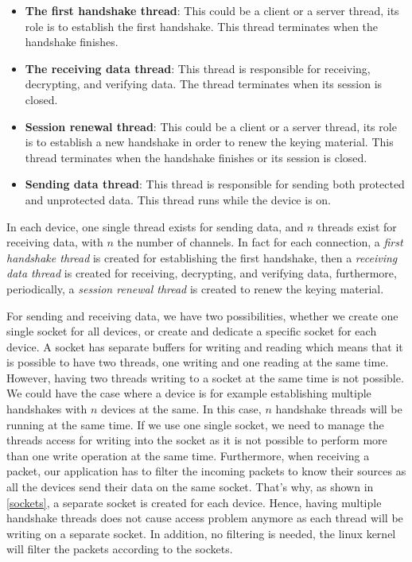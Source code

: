\renewcommand{\labelitemi}{$\bullet$}
\begin{itemize}
\item \textbf{The first handshake thread}: This could be a client or a server thread, its role is to establish
the first handshake. This thread terminates when the handshake finishes.

\item \textbf{The receiving data thread}: This thread is responsible for receiving, decrypting, and verifying
data. The thread terminates when its session is closed.

\item \textbf{Session renewal thread}: This could be a client or a server thread, its role is to
establish a new handshake in order to renew the keying material. This thread terminates when the handshake
finishes or its session is closed.

\item \textbf{Sending data thread}: This thread is responsible for sending both protected and unprotected
data. This thread runs while the device is on.
\end{itemize}

In each device, one single thread exists for sending data, and $n$ threads exist for receiving data, with $n$
the number of channels. In fact for each connection, a \textit{first handshake thread} is created for establishing
the first handshake, then a \textit{receiving data thread} is created for receiving, decrypting, and verifying
data, furthermore, periodically, a \textit{session renewal thread} is created to renew the keying material.

For sending and receiving data, we have two possibilities, whether we create one single socket for all devices, or
create and dedicate a specific socket for each device. A socket has separate buffers for writing and reading
which means that it is possible to have two threads, one writing and one reading at the same time. However, having two
threads writing to a socket at the same time is not possible. We could have the case where a device is for example
establishing multiple handshakes with $n$ devices at the same. In this case, $n$ handshake threads will be running at the same
time. If we use one single socket, we need to manage the threads access for writing into the socket as it is not
possible to perform more than one write operation at the same time. Furthermore, when receiving a packet,
our application has to filter the incoming packets to know their sources as all the devices send their data
on the same socket. That's why, as shown in \autoref{sockets}, a separate socket is created for each device. Hence, having multiple
handshake threads does not cause access problem anymore as each thread will be writing on a separate socket. In
addition, no filtering is needed, the linux kernel will filter the packets according to the sockets.

